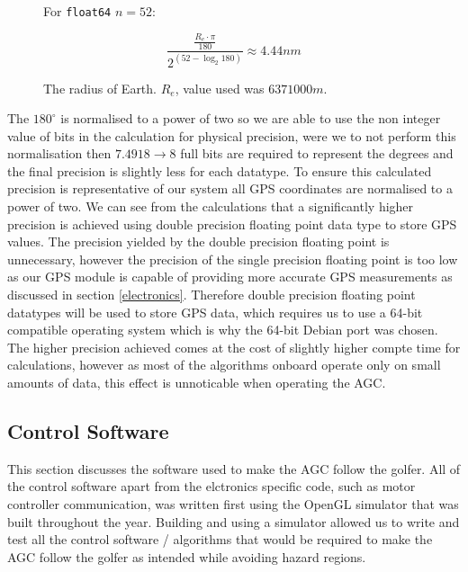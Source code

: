 \documentclass[11pt,landscape]{article}
\begin{document}
\begin{multicols}{3}
\begin{figure}[H]
\begin{mdframed}
\begin{center}
                \begin{minipage}{0.45\textwidth}
                    \begin{mdframed}
                For \verb|float64| $n=52$:
                \begin{center}
                    \begin{equation*}
                        \frac{\frac{R_e \cdot \pi}{180}}{2^{\left(52 - \log_2{180}\right)}} \approx 4.44nm
                    \end{equation*}
                \end{center}
            \end{mdframed}
            \end{minipage}
        \end{center}
        \center The radius of Earth. $R_e$, value used was $6371000m$. 
    \end{mdframed} 
    \label{fig:float_calcs}
\end{figure}
The $180^{\circ}$ is normalised to a power of two so we are able to use the non
integer value of bits in the calculation for physical precision, were we to not
perform this normalisation then $7.4918\rightarrow8$ full bits are required to
represent the degrees and the final precision is slightly less for each
datatype. To ensure this calculated precision is representative of our system
all GPS coordinates are normalised to a power of two. We can see from the
calculations that a significantly higher precision is achieved using double
precision floating point data type to store GPS values. The precision yielded by
the double precision floating point is unnecessary, however the precision of the
single precision floating point is too low as our GPS module is capable of
providing more accurate GPS measurements as discussed in section
\ref{electronics}. Therefore double precision floating point datatypes will be
used to store GPS data, which requires us to use a 64-bit compatible operating
system which is why the 64-bit Debian port was chosen. The higher precision
achieved comes at the cost of slightly higher compte time for calculations,
however as most of the algorithms onboard operate only on small amounts of data,
this effect is unnoticable when operating the AGC.

\subsection{Control Software}
\label{control_software}
This section discusses the software used to make the AGC follow the golfer. All
of the control software apart from the elctronics specific code, such as motor
controller communication, was written first using the OpenGL simulator that was
built throughout the year. Building and using a simulator allowed us to write
and test all the control software / algorithms that would be required to make
the AGC follow the golfer as intended while avoiding hazard regions.


\end{multicols}
\end{document}

